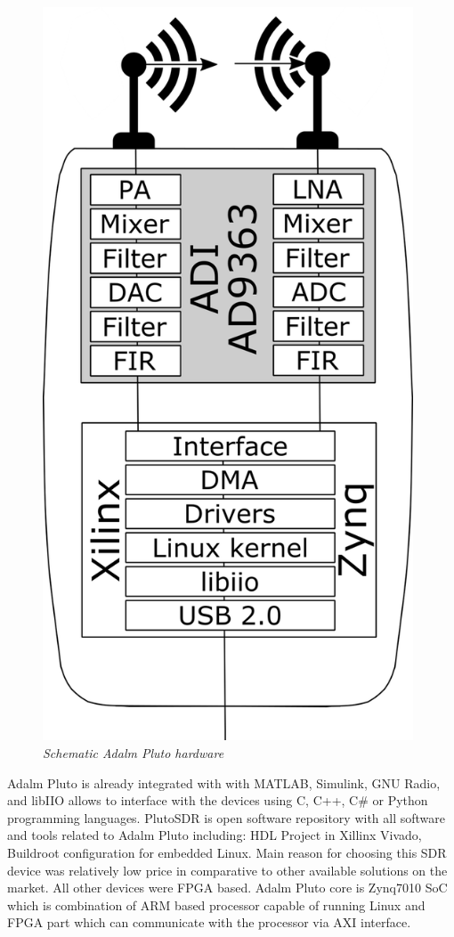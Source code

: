 \documentclass[en,printmode]{mgr}
\begin{document}
			\begin{figure}[!htb]
    			\centering
   				\includegraphics[width=11cm]{images/pluto_schematic.png}
   		 		\caption{\textit{Schematic Adalm Pluto hardware}}
			\end{figure}
			
			Adalm Pluto is already integrated with with MATLAB, Simulink, GNU Radio, and libIIO
			allows to interface with the devices using C, C++, C\# or Python programming languages.
			PlutoSDR is open software repository with all software and tools related to Adalm Pluto
			including: HDL Project in Xillinx Vivado, Buildroot configuration for embedded Linux.
			Main reason for choosing this SDR device was relatively low price in comparative to other
			available solutions on the market. All other devices were FPGA based. Adalm Pluto core is 			Zynq7010 SoC which is combination of ARM based processor capable of running Linux and
			FPGA part which can communicate with the processor via AXI interface.
\end{document}
